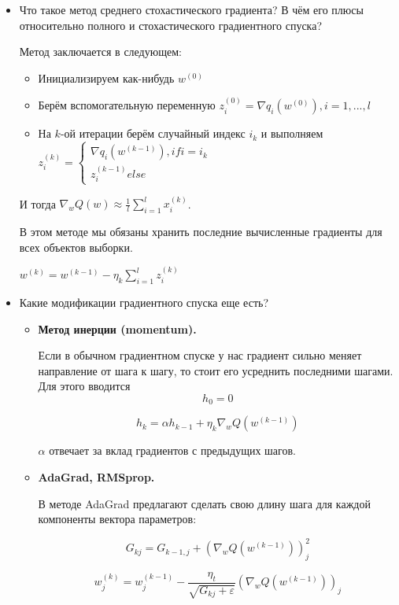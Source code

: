 \documentclass[12pt]{article}
\begin{document}
\begin{itemize}
\item Что такое метод среднего стохастического градиента? В чём его плюсы относительно полного и стохастического градиентного спуска?

Метод заключается в следующем:

\begin{itemize}

\item Инициализируем как-нибудь $w^{(0)}$
\item Берём вспомогательную переменную $z_i^{(0)} = \nabla q_i (w^{(0)}), i = 1, ..., l$
\item На $k$-ой итерации берём случайный индекс $i_k$ и выполняем $z_i^{(k)} = \begin{cases}
\nabla q_i (w^{(k-1)}), if i = i_k \\
z_i^{(k-1)} else
\end{cases} $

\end{itemize}

И тогда $\nabla_w Q(w) \approx \frac{1}{l} \sum_{i=1}^l x_i^{(k)}$.

В этом методе мы обязаны хранить последние вычисленные градиенты для всех объектов выборки.

$w^{(k)} = w^{(k-1)} - \eta_k \sum_{i=1}^l z_i^{(k)}$


\item Какие модификации градиентного спуска еще есть?

\begin{itemize}

\item \textbf{Метод инерции (momentum).}

Если в обычном градиентном спуске у нас градиент сильно меняет направление от шага к шагу, то стоит его усреднить последними шагами. Для этого вводится 
\[ h_0 = 0 \]

\[ h_k = \alpha h_{k-1} + \eta_k \nabla_w Q(w^{(k-1)})\]

$\alpha$ отвечает за вклад градиентов с предыдущих шагов.

\item \textbf{AdaGrad, RMSprop.}

В методе AdaGrad предлагают сделать свою длину шага для каждой компоненты вектора параметров:

\[ G_{kj} = G_{k-1, j} + \left( \nabla_w Q(w^{(k-1)} ) \right)_j^2 \]

\[ w_j^{(k)} = w_j^{(k-1)} - \frac{\eta_t}{\sqrt{G_{kj}+\varepsilon}} \left( \nabla_w Q(w^{(k-1)}) \right)_j \]


\end{itemize}
\end{itemize}
\end{document}
